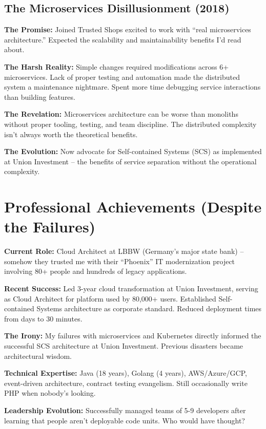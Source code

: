 \documentclass[11pt,a4paper]{article}
\begin{document}
\subsection{The Microservices Disillusionment (2018)}
\textbf{The Promise:} Joined Trusted Shops excited to work with ``real microservices architecture.'' Expected the scalability and maintainability benefits I'd read about.

\textbf{The Harsh Reality:} Simple changes required modifications across 6+ microservices. Lack of proper testing and automation made the distributed system a maintenance nightmare. Spent more time debugging service interactions than building features.

\textbf{The Revelation:} Microservices architecture can be worse than monoliths without proper tooling, testing, and team discipline. The distributed complexity isn't always worth the theoretical benefits.

\textbf{The Evolution:} Now advocate for Self-contained Systems (SCS) as implemented at Union Investment -- the benefits of service separation without the operational complexity.

\section{Professional Achievements (Despite the Failures)}

\textbf{Current Role:} Cloud Architect at LBBW (Germany's major state bank) -- somehow they trusted me with their ``Phoenix'' IT modernization project involving 80+ people and hundreds of legacy applications.

\textbf{Recent Success:} Led 3-year cloud transformation at Union Investment, serving as Cloud Architect for platform used by 80,000+ users. Established Self-contained Systems architecture as corporate standard. Reduced deployment times from days to 30 minutes.

\textbf{The Irony:} My failures with microservices and Kubernetes directly informed the successful SCS architecture at Union Investment. Previous disasters became architectural wisdom.

\textbf{Technical Expertise:} Java (18 years), Golang (4 years), AWS/Azure/GCP, event-driven architecture, contract testing evangelism. Still occasionally write PHP when nobody's looking.

\textbf{Leadership Evolution:} Successfully managed teams of 5-9 developers after learning that people aren't deployable code units. Who would have thought?
\end{document}
